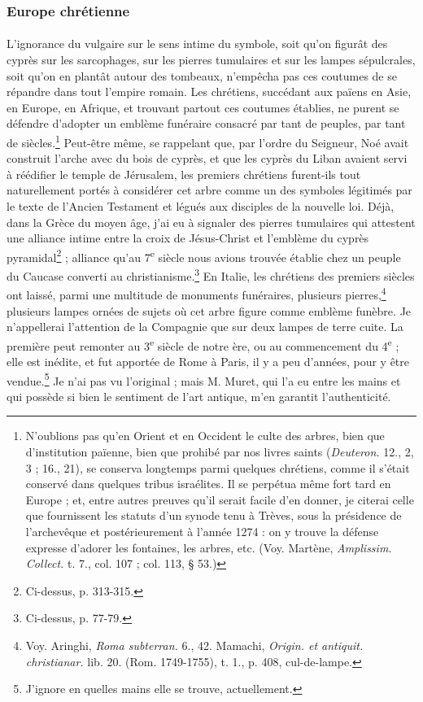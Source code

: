 \documentclass{article}
\begin{document}
\subsubsection{Europe chrétienne}
\paragraph{}
L'ignorance du vulgaire sur le sens intime du symbole, soit qu'on figurât des cyprès sur les sarcophages, sur les pierres tumulaires et sur les lampes sépulcrales, soit qu'on en plantât autour des tombeaux, n'empêcha pas ces coutumes de se répandre dans tout l'empire romain. Les chrétiens, succédant aux païens en Asie, en Europe, en Afrique, et trouvant partout ces coutumes établies, ne purent se défendre d'adopter un emblème funéraire consacré par tant de peuples, par tant de siècles.\footnote{N'oublions pas qu'en Orient et en Occident le culte des arbres, bien que d'institution païenne, bien que prohibé par nos livres saints (\emph{Deuteron.} 12., 2, 3 ; 16., 21), se conserva longtemps parmi quelques chrétiens, comme il s'était conservé dans quelques tribus israélites. Il se perpétua même fort tard en Europe ; et, entre autres preuves qu'il serait facile d'en donner, je citerai celle que fournissent les statuts d'un synode tenu à Trèves, sous la présidence de l'archevêque et postérieurement à l'année 1274 : on y trouve la défense expresse d'adorer les fontaines, les arbres, etc. (Voy. Martène, \emph{Amplissim. Collect.} t. 7., col. 107 ; col. 113, § 53.)} Peut-être même, se rappelant que, par l'ordre du Seigneur, Noé avait construit l'arche avec du bois de cyprès, et que les cyprès du Liban avaient servi à réédifier le temple de Jérusalem, les premiers chrétiens furent-ils tout naturellement portés à considérer cet arbre comme un des symboles légitimés par le texte de l'Ancien Testament et légués aux disciples de la nouvelle loi. Déjà, dans la Grèce du moyen âge, j'ai eu à signaler des pierres tumulaires qui attestent une alliance intime entre la croix de Jésus-Christ et l'emblème du cyprès pyramidal\footnote{Ci-dessus, p. 313-315.} ; alliance qu'au 7\textsuperscript{e} siècle nous avions trouvée établie chez un peuple du Caucase converti au christianisme.\footnote{Ci-dessus, p. 77-79.} En Italie, les chrétiens des premiers siècles ont laissé, parmi une multitude de monuments funéraires, plusieurs pierres,\footnote{Voy. Aringhi, \emph{Roma subterran.} 6., 42. Mamachi, \emph{Origin. et antiquit. christianar.} lib. 20. (Rom. 1749-1755), t. 1., p. 408, cul-de-lampe.} plusieurs lampes ornées de sujets où cet arbre figure comme emblème funèbre. Je n'appellerai l'attention de la Compagnie que sur deux lampes de terre cuite. La première peut remonter au 3\textsuperscript{e} siècle de notre ère, ou au commencement du 4\textsuperscript{e} ; elle est inédite, et fut apportée de Rome à Paris, il y a peu d'années, pour y être vendue.\footnote{J'ignore en quelles mains elle se trouve, actuellement.} Je n'ai pas vu l'original ; mais M. Muret, qui l'a eu entre les mains et qui possède si bien le sentiment de l'art antique, m'en garantit l'authenticité.
\end{document}
